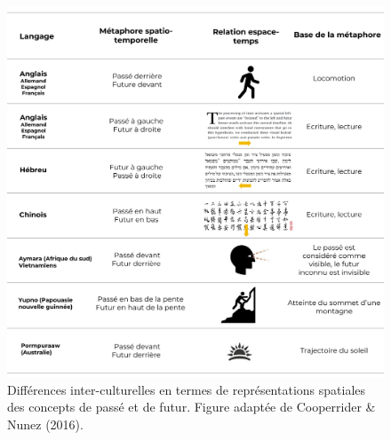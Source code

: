 \documentclass[
  a4paper,12pt,twoside,onecolumn,openright,final,oldfontcommands]{memoir}
\begin{document}
\begin{figure}[htbp!]

{\centering \includegraphics[width=1\linewidth]{figures/chap6-fig1} 

}

\caption{Différences inter-culturelles en termes de représentations spatiales des concepts de passé et de futur. Figure adaptée de Cooperrider \& Nunez (2016). }\label{fig:chap6-fig1}
\end{figure}
\end{document}
